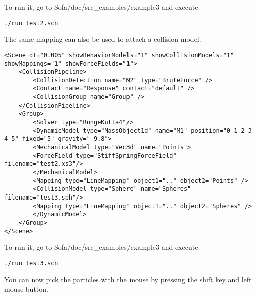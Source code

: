 To run it, go to Sofa/doc/src\_examples/example3 and execute
\begin{verbatim}
./run test2.scn
\end{verbatim}

The same mapping can also be used to attach a collision model:

\begin{verbatim}
<Scene dt="0.005" showBehaviorModels="1" showCollisionModels="1" showMappings="1" showForceFields="1">
	<CollisionPipeline>
		<CollisionDetection name="N2" type="BruteForce" />
		<Contact name="Response" contact="default" />
		<CollisionGroup name="Group" />
	</CollisionPipeline>
	<Group>
		<Solver type="RungeKutta4"/>
		<DynamicModel type="MassObject1d" name="M1" position="0 1 2 3 4 5" fixed="5" gravity="-9.8">
		<MechanicalModel type="Vec3d" name="Points">
		<ForceField type="StiffSpringForceField" filename="test2.xs3"/>
		</MechanicalModel>
		<Mapping type="LineMapping" object1=".." object2="Points" />
		<CollisionModel type="Sphere" name="Spheres" filename="test3.sph"/>
		<Mapping type="LineMapping" object1=".." object2="Spheres" />
		</DynamicModel>
	</Group>
</Scene>
\end{verbatim}

To run it, go to Sofa/doc/src\_examples/example3 and execute
\begin{verbatim}
./run test3.scn
\end{verbatim}

You can now pick the particles with the mouse by pressing the shift key and left mouse button.
